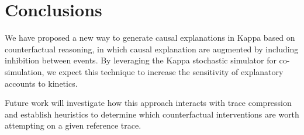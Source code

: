 \section*{Conclusions}

We have proposed a new way to generate causal explanations in Kappa
based on counterfactual reasoning, in which causal explanation are
augmented by including inhibition between events. By leveraging the
Kappa stochastic simulator for co-simulation, we expect this technique
to increase the sensitivity of explanatory accounts to kinetics.

Future work will investigate how this approach interacts with trace
compression \cite{DBLP:conf/fsttcs/DanosFFHH12} and establish
heuristics to determine which counterfactual interventions are worth
attempting on a given reference trace.